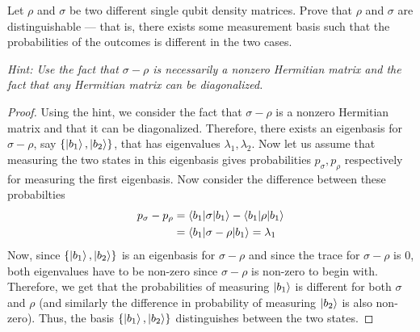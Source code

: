 \begin{solution}[label=ques1]
  \begin{question}
    Let $\rho$ and $\sigma$ be two different single qubit density matrices. Prove that $\rho$ and $\sigma$ are distinguishable --- that is, there exists some measurement basis such that the probabilities of the outcomes is different in the two cases. 

\noindent \textit{Hint: Use the fact that $\sigma-\rho$ is necessarily a nonzero Hermitian matrix and the fact that any Hermitian matrix can be diagonalized.}
  \end{question}
  \tcblower{}
  \begin{proof}
    Using the hint, we consider the fact that $\sigma - \rho$ is a nonzero Hermitian matrix and that it can be diagonalized. Therefore, there exists an eigenbasis for $\sigma - \rho$, say $\{\ket{b_1}, \ket{b_2}\}$, that has eigenvalues $\lambda_1, \lambda_2$. Now let us assume that measuring the two states in this eigenbasis gives probabilities $p_{\sigma}, p_{\rho}$ respectively for measuring the first eigenbasis. Now consider the difference between these probabilties
    \begin{equation}
      \begin{split}
        p_{\sigma} - p_{\rho} &= \braket{b_1|\sigma|b_1} - \braket{b_1|\rho|b_1} \\
        &= \braket{b_1|\sigma - \rho|b_1} = \lambda_1
      \end{split}
      \label{eq:distinguish}
    \end{equation}
    Now, since $\{\ket{b_1}, \ket{b_2}\}$ is an eigenbasis for $\sigma - \rho$ and since the trace for $\sigma - \rho$ is $0$, both eigenvalues have to be non-zero since $\sigma - \rho$ is non-zero to begin with. Therefore, we get that the probabilities of measuring $\ket{b_1}$ is different for both $\sigma$ and $\rho$ (and similarly the difference in probability of measuring $\ket{b_2}$ is also non-zero). Thus, the basis $\{\ket{b_1}, \ket{b_2}\}$ distinguishes between the two states.
  \end{proof}
\end{solution}
